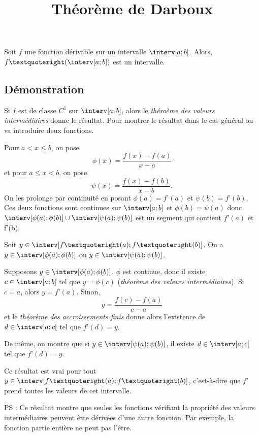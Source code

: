 \documentclass[fontsize=12pt,twoside=false,parskip=half]{scrartcl}
\title{Théorème de Darboux}
\date{}
\author{}
\begin{document}
\maketitle
   \begin{Theoreme}
      Soit $f$ une fonction dérivable sur un intervalle $\interv[a; b]$. Alors, $f’(\interv[a; b])$ est un intervalle.
   \end{Theoreme}
   \subsection{Démonstration}
      Si $f$ est de classe $C^1$ sur $\interv[a; b]$, alors le \emph{théroème des valeurs intermédiaires} donne le 
      résultat. Pour montrer le résultat dans le cas général on va introduire deux fonctions. 
      
      Pour $a < x \leq b$, on pose
      \[
         \phi(x) = \frac{f(x) - f(a)}{x - a}
      \]
      et pour $a \leq x < b$, on pose
      \[
         \psi(x) = \frac{f(x) - f(b)}{x - b}.
      \]
      On les prolonge par continuité en posant $\phi(a) = f’(a)$ et $\psi(b) = f’(b)$. Ces deux fonctions sont
      continues sur $\interv[a; b]$ et $\phi(b) = \psi(a)$ donc $\interv[\phi(a); \phi(b)] \cup \interv[\psi(a); \psi(b)]$
      est un segment qui contient $f’(a)$ et f’(b).
      
      Soit $y \in \interv[f’(a); f’(b)]$. On a $y \in \interv[\phi(a); \phi(b)]$ ou $y \in \interv[\psi(a); \psi(b)]$.
      
      Supposons $y \in \interv[\phi(a); \phi(b)]$. $\phi$ est continue, donc il existe $c \in \interv[a; b]$ tel que
      $y = \phi(c)$ (\emph{théorème des valeurs intermédiaires}). Si $c = a$, alors $y = f’(a)$. Sinon,
      \[
         y = \frac{f(c) - f(a)}{c - a}
      \]
      et le \emph{théorème des accroissements finis} donne alors l’existence de $d \in \interv]a; c[$ tel que 
      $f’(d) = y$.
      
      De même, on montre que si $y \in \interv[\psi(a); \psi(b)]$, il existe $d \in \interv]a; c[$ tel que 
      $f’(d) = y$.
      
      Ce résultat est vrai pour tout $y \in \interv[f’(a); f’(b)]$, c’est-à-dire que $f’$ prend toutes les valeurs 
      de cet intervalle.

      PS : Ce résultat montre que seules les fonctions vérifiant la propriété des valeurs intermédiaires peuvent être
      dérivées d’une autre fonction. Par exemple, la fonction partie entière ne peut pas l’être.
\end{document}
